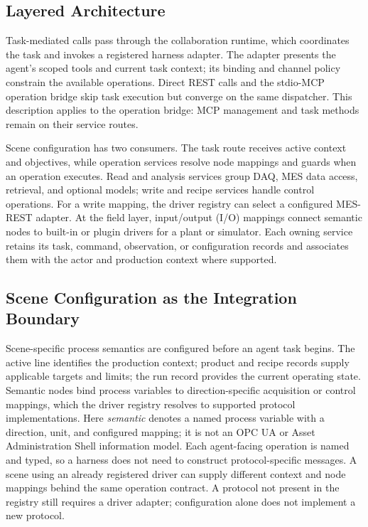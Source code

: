 \subsection{Layered Architecture}
\label{sec:layers}
Task-mediated calls pass through the collaboration runtime, which coordinates
the task and invokes a registered harness adapter. The adapter presents the
agent's scoped tools and current task context; its binding and channel policy
constrain the available operations. Direct REST calls and the stdio-MCP
operation bridge skip task execution but converge on the same dispatcher. This
description applies to the operation bridge: MCP management and task methods
remain on their service routes.

Scene configuration has two consumers. The task route receives active context
and objectives, while operation services resolve node mappings and guards when
an operation executes. Read and analysis services group DAQ, MES data access,
retrieval, and optional models; write and recipe services handle control
operations. For a write mapping, the driver registry can select a configured
MES-REST adapter. At the field layer, input/output (I/O) mappings connect
semantic nodes to built-in or plugin drivers for a plant or simulator. Each
owning service retains its task, command, observation, or configuration
records and associates them with the actor and production context where
supported.

\subsection{Scene Configuration as the Integration Boundary}
\label{sec:scene-config}
Scene-specific process semantics are configured before an
agent task begins. The active line identifies the production context; product
and recipe records supply applicable targets and limits; the run record
provides the current operating state. Semantic nodes bind process variables
to direction-specific acquisition or control mappings, which the driver
registry resolves to supported protocol implementations. Here
\emph{semantic} denotes a named process variable with a direction, unit, and
configured mapping; it is not an OPC UA or Asset Administration Shell
information model. Each agent-facing operation is named and typed, so a harness does not need to
construct protocol-specific messages. A scene using an already registered
driver can supply different context and node mappings behind the same
operation contract. A protocol not present in the registry still requires a
driver adapter; configuration alone does not implement a new protocol.

